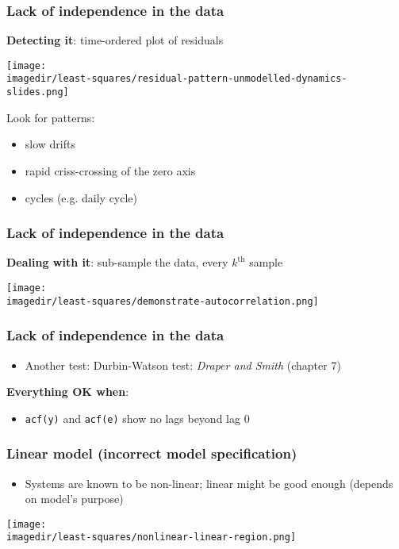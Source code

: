 \begin{frame}\frametitle{Lack of independence in the data}

	\textbf{Detecting it}: time-ordered plot of residuals
	\begin{center}
		\texttt{[image: \\imagedir/least-squares/residual-pattern-unmodelled-dynamics-slides.png]}
	\end{center}
	Look for patterns:
	\begin{itemize}
		\item	slow drifts
		\item	rapid criss-crossing of the zero axis
		\item	cycles (e.g. daily cycle)
	\end{itemize}
\end{frame}

\begin{frame}\frametitle{Lack of independence in the data}

	\textbf{Dealing with it}: sub-sample the data, every $k^\text{th}$ sample
	\begin{center}
		\texttt{[image: \\imagedir/least-squares/demonstrate-autocorrelation.png]}
	\end{center}
\end{frame}

\begin{frame}\frametitle{Lack of independence in the data}
	\begin{itemize}
		\item	Another test: Durbin-Watson test: \emph{Draper and Smith} (chapter 7)
	\end{itemize}

	\textbf{Everything OK when}:
	\begin{itemize}
		\item	\texttt{acf(y)} and \texttt{acf(e)} show no lags beyond lag 0
	\end{itemize}
\end{frame}

\begin{frame}\frametitle{Linear model (incorrect model specification)}
	\begin{itemize}
		\item	Systems are known to be non-linear; linear might be good enough (depends on model's purpose)
	\end{itemize}
	\begin{center}
		\texttt{[image: \\imagedir/least-squares/nonlinear-linear-region.png]}
	\end{center}
\end{frame}

